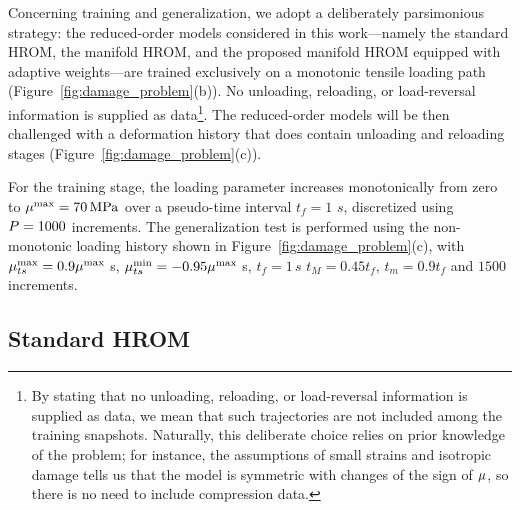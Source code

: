\documentclass[preprint,10pt]{elsarticle}  %
\newcommand{\PROMPT}[1]{ }
\begin{document}
Concerning training and generalization, we adopt a deliberately
parsimonious strategy: the  reduced-order models
considered in this work---namely the standard HROM, the manifold HROM,
and the proposed manifold HROM equipped with adaptive weights---are trained exclusively on a monotonic tensile loading path
(Figure~\ref{fig:damage_problem}(b)). No unloading, reloading, or
load-reversal information is supplied as data\footnote{ By stating that no unloading,
reloading, or load-reversal information is supplied as data, we mean
that such trajectories are not included among the training snapshots.
Naturally, this deliberate choice relies on prior knowledge of the
problem; for instance,  the assumptions of small strains and isotropic damage tells us that the model is symmetric with changes of the sign of $\mu$, so there is no need to include compression data.  }. The
reduced-order models will be then challenged with a deformation history
that does contain unloading and reloading stages
(Figure~\ref{fig:damage_problem}(c)).



For the training stage, the loading parameter increases monotonically
from zero to \(\mu^{\mathrm{max}}=70\,\mathrm{MPa}\) over a pseudo-time interval
\(t_f=1\) $s$, discretized using \(P=1000\)   increments.
The generalization test is performed using the non-monotonic loading
history shown in Figure~\ref{fig:damage_problem}(c), with
\(\mu^{\max}_{ts}=0.9\mu^{\mathrm{max}}\) s,
\(\mu^{\min}_{ts}=-0.95\mu^{\mathrm{max}}\) s, \(t_f=1 \, s\)
\(t_M=0.45 t_f\),   \(t_m=0.9 t_f\) and  \(1500\)  increments.





\subsection{Standard HROM}


%


%

%

%
\end{document}
